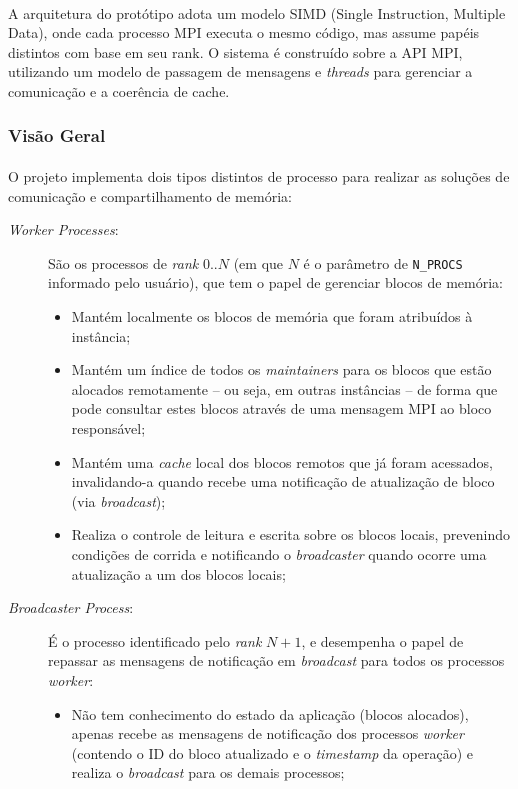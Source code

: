 \documentclass[12pt]{article}
\begin{document}
\paragraph{}
A arquitetura do protótipo adota um modelo SIMD (Single Instruction, Multiple Data), onde cada processo MPI executa o
mesmo código, mas assume papéis distintos com base em seu rank. O sistema é construído sobre a API MPI, utilizando um
modelo de passagem de mensagens e \textit{threads} para gerenciar a comunicação e a coerência de cache.

\subsubsection{Visão Geral}
\paragraph{}
O projeto implementa dois tipos distintos de processo para realizar as soluções de comunicação e compartilhamento de
memória:

\begin{description}
  \item[\textit{Worker Processes}:] São os processos de \textit{rank} \(0 .. N\) (em que \(N\) é o parâmetro de \texttt{N\_PROCS} informado pelo usuário), que tem o papel de gerenciar blocos de memória:
    \begin{itemize}
      \item Mantém localmente os blocos de memória que foram atribuídos à instância;
      \item Mantém um índice de todos os \textit{maintainers} para os blocos que estão alocados remotamente -- ou seja,
        em outras instâncias -- de forma que pode consultar estes blocos através de uma mensagem MPI ao bloco
        responsável;
      \item Mantém uma \textit{cache} local dos blocos remotos que já foram acessados, invalidando-a quando recebe uma
        notificação de atualização de bloco (via \textit{broadcast});
      \item Realiza o controle de leitura e escrita sobre os blocos locais, prevenindo condições de corrida e
        notificando o \textit{broadcaster} quando ocorre uma atualização a um dos blocos locais;
    \end{itemize}
  \item[\textit{Broadcaster Process}:] É o processo identificado pelo \textit{rank} \(N + 1\), e desempenha o papel de repassar as mensagens de notificação em \textit{broadcast} para todos os processos \textit{worker}:
    \begin{itemize}
      \item Não tem conhecimento do estado da aplicação (blocos alocados), apenas recebe as mensagens de notificação dos
        processos \textit{worker} (contendo o ID do bloco atualizado e o \textit{timestamp} da operação) e realiza o
        \textit{broadcast} para os demais processos;
    \end{itemize}
\end{description}
\end{document}
